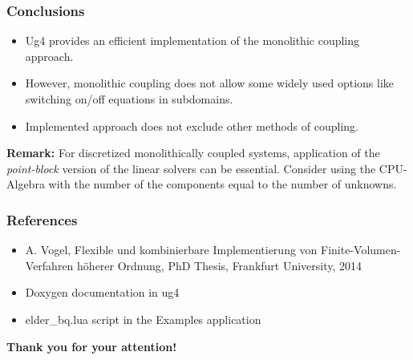 
\begin {frame} [t]
\frametitle {Conclusions}
\begin {itemize}
 \item Ug4 provides an efficient implementation of the monolithic coupling approach.
 \item However, monolithic coupling does not allow some widely used options like
  switching on/off equations in subdomains.
 \item Implemented approach does not exclude other methods of coupling.
\end {itemize}

\pause
\vspace{4ex}
\textbf{\color{blue} Remark:} For discretized monolithically coupled systems, application
of the \emph{\color{blue} point-block} version of the linear solvers can be essential.
Consider using the CPU-Algebra with the number of the components equal to the number
of unknowns.
\end {frame}

\begin {frame} [t]
\frametitle {References}
\begin {itemize}
 \item A. Vogel, Flexible und kombinierbare Implementierung von Finite-Volumen-Verfahren
  h{\" o}herer Ordnung, PhD Thesis, Frankfurt University, 2014
 \item Doxygen documentation in ug4
 \item elder\_bq.lua script in the Examples application
\end {itemize}

\vspace {15ex}
\centerline {\huge \textbf {\color{blue} Thank you for your attention!}}
\end {frame}

